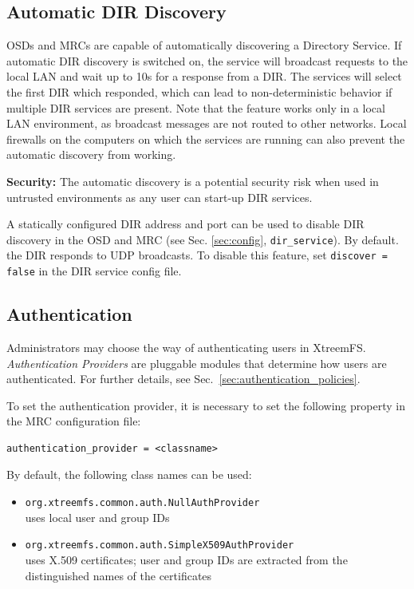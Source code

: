 \documentclass[a4paper,10pt]{book}
\begin{document}
\subsection{Automatic DIR Discovery}
\label{sec:autodiscover}
OSDs and MRCs are capable of automatically discovering a Directory Service. If automatic DIR discovery is switched on, the service will broadcast requests to the local LAN and wait up to 10s for a response from a DIR. The services will select the first DIR which responded, which can lead to non-deterministic behavior if multiple DIR services are present. Note that the feature works only in a local LAN environment, as broadcast messages are not routed to other networks. Local firewalls on the computers on which the services are running can also prevent the automatic discovery from working.

\textbf{Security:} The automatic discovery is a potential security risk when used in untrusted environments as any user can start-up DIR services.

A statically configured DIR address and port can be used to disable DIR discovery in the OSD and MRC (see Sec. \ref{sec:config}, \texttt{dir\_service}). By default. the DIR responds to UDP broadcasts. To disable this feature, set  \texttt{discover = false} in the DIR service config file.


\subsection{Authentication}
\label{sec:AuthProvider}
Administrators may choose the way of authenticating users in XtreemFS. \emph{Authentication Providers} are pluggable modules that determine how users are authenticated. For further details, see Sec.\ \ref{sec:authentication_policies}.

To set the authentication provider, it is necessary to set the following property in the MRC configuration file:

\begin{verbatim}
authentication_provider = <classname>
\end{verbatim}

By default, the following class names can be used:

\begin{itemize}
 \item \texttt{org.xtreemfs.common.auth.NullAuthProvider}\\
uses local user and group IDs
 \item \texttt{org.xtreemfs.common.auth.SimpleX509AuthProvider}\\
uses X.509 certificates; user and group IDs are extracted from the distinguished names of the certificates
\end{itemize}
\end{document}
